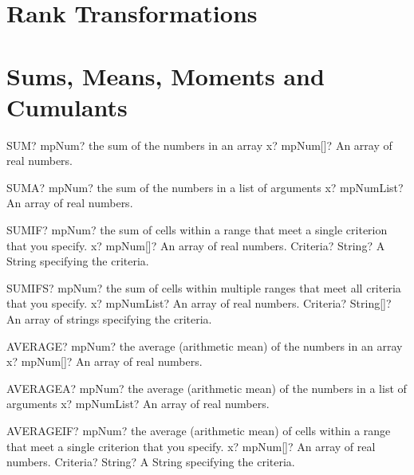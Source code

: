 \documentclass[12pt,a4paper,openany]{book}
\begin{document}
\section{Rank Transformations}

\section{Sums, Means, Moments and Cumulants}

\begin{mpFunctionsExtract}
\mpWorksheetFunctionOneNotImplemented
{SUM? mpNum? the sum of the numbers in an array}
{x? mpNum[]? An array of real numbers.}
\end{mpFunctionsExtract}

\begin{mpFunctionsExtract}
\mpWorksheetFunctionOneNotImplemented
{SUMA? mpNum? the sum of the numbers in a list of arguments}
{x? mpNumList? An array of real numbers.}
\end{mpFunctionsExtract}

\begin{mpFunctionsExtract}
\mpWorksheetFunctionTwoNotImplemented
{SUMIF? mpNum? the sum of cells within a range that meet a single criterion that you specify.}
{x? mpNum[]? An array of real numbers.}
{Criteria? String? A String specifying the criteria.}
\end{mpFunctionsExtract}

\begin{mpFunctionsExtract}
\mpWorksheetFunctionTwoNotImplemented
{SUMIFS? mpNum? the sum of cells within multiple ranges that meet all criteria that you specify.}
{x? mpNumList? An array of real numbers.}
{Criteria? String[]? An array of strings specifying the criteria.}
\end{mpFunctionsExtract}

\begin{mpFunctionsExtract}
\mpWorksheetFunctionOneNotImplemented
{AVERAGE? mpNum? the average (arithmetic mean) of the numbers in an array}
{x? mpNum[]? An array of real numbers.}
\end{mpFunctionsExtract}

\begin{mpFunctionsExtract}
\mpWorksheetFunctionOneNotImplemented
{AVERAGEA? mpNum? the average (arithmetic mean) of the numbers in a list of arguments}
{x? mpNumList? An array of real numbers.}
\end{mpFunctionsExtract}

\begin{mpFunctionsExtract}
\mpWorksheetFunctionTwoNotImplemented
{AVERAGEIF? mpNum? the average (arithmetic mean) of cells within a range that meet a single criterion that you specify.}
{x? mpNum[]? An array of real numbers.}
{Criteria? String? A String specifying the criteria.}
\end{mpFunctionsExtract}
\end{document}
